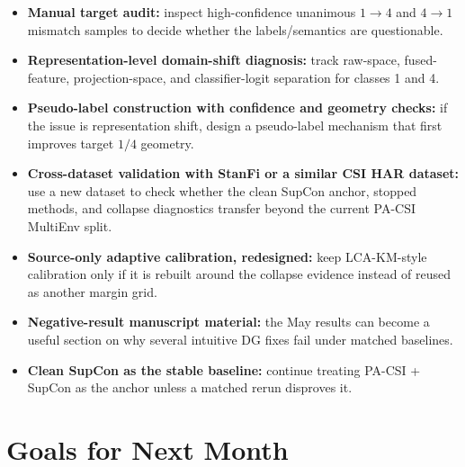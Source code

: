 \documentclass[11pt]{article}
\begin{document}
\begin{itemize}[leftmargin=*]
    \item \textbf{Manual target audit:} inspect high-confidence unanimous $1\rightarrow4$ and $4\rightarrow1$ mismatch samples to decide whether the labels/semantics are questionable.
    \item \textbf{Representation-level domain-shift diagnosis:} track raw-space, fused-feature, projection-space, and classifier-logit separation for classes 1 and 4.
    \item \textbf{Pseudo-label construction with confidence and geometry checks:} if the issue is representation shift, design a pseudo-label mechanism that first improves target $1/4$ geometry.
    \item \textbf{Cross-dataset validation with StanFi or a similar CSI HAR dataset:} use a new dataset to check whether the clean SupCon anchor, stopped methods, and collapse diagnostics transfer beyond the current PA-CSI MultiEnv split.
    \item \textbf{Source-only adaptive calibration, redesigned:} keep LCA-KM-style calibration only if it is rebuilt around the collapse evidence instead of reused as another margin grid.
    \item \textbf{Negative-result manuscript material:} the May results can become a useful section on why several intuitive DG fixes fail under matched baselines.
    \item \textbf{Clean SupCon as the stable baseline:} continue treating PA-CSI + SupCon as the anchor unless a matched rerun disproves it.
\end{itemize}

\clearpage
\section{Goals for Next Month}
\end{document}
